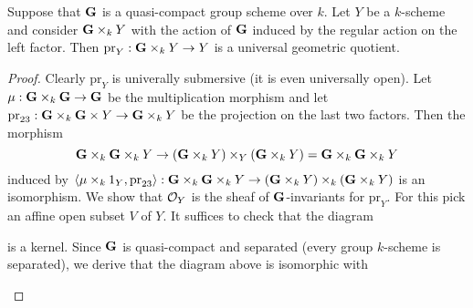 \begin{proposition}\label{proposition:trivial_bundle_is_universal_geometric_quotient}
Suppose that $\mathbf{G}$ is a quasi-compact group scheme over $k$. Let $Y$ be a $k$-scheme and consider $\mathbf{G}\times_kY$ with the action of $\mathbf{G}$ induced by the regular action on the left factor. Then $\mathrm{pr}_Y:\mathbf{G}\times_kY\rightarrow Y$ is a universal geometric quotient. 
\end{proposition}
\begin{proof}
Clearly $\mathrm{pr}_Y$ is univerally submersive (it is even universally open). Let $\mu:\mathbf{G}\times_k\mathbf{G}\rightarrow \mathbf{G}$ be the multiplication morphism and let $\mathrm{pr}_{23}:\mathbf{G}\times_k\mathbf{G}\times Y\rightarrow \mathbf{G}\times_kY$ be the projection on the last two factors. Then the morphism 
$$\mathbf{G}\times_k\mathbf{G}\times_kY\rightarrow \left(\mathbf{G}\times_kY\right)\times_Y\left(\mathbf{G}\times_kY\right) = \mathbf{G}\times_k\mathbf{G}\times_kY$$
induced by $\langle \mu\times_k1_Y, \mathrm{pr}_{23}\rangle:\mathbf{G}\times_k\mathbf{G}\times_kY\rightarrow \left(\mathbf{G}\times_kY\right)\times_k\left(\mathbf{G}\times_kY\right)$ is an isomorphism. We show that ${\mathcal O}_Y$ is the sheaf of $\mathbf{G}$-invariants for $\mathrm{pr}_Y$. For this pick an affine open subset $V$ of $Y$. It suffices to check that the diagram
\begin{center}
\end{center}
is a kernel. Since $\mathbf{G}$ is quasi-compact and separated (every group $k$-scheme is separated), we derive that the diagram above is isomorphic with
\begin{center}
\end{center}
\end{proof}
